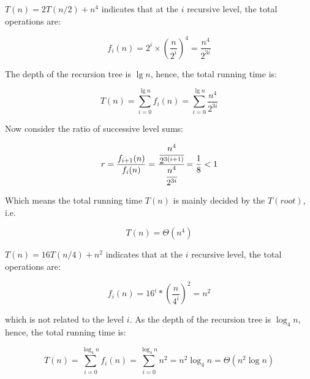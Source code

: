 \begin{homeworkProblem}

\begin{homeworkSubProblem}[\texorpdfstring{$T(n)=2T(n/2)+n^4$}{T(n)=2T(n/2)+n\textasciicircum 4}]\label{sub6.1}
$T(n)=2T(n/2)+n^4$ indicates that at the $i$ recursive level, the total
operations are:

\begin{equation}
f_i(n) = 2^i\times\left(\frac{n}{2^i}\right)^4=\frac{n^4}{2^{3i}}
\end{equation}

The depth of the recursion tree is $\lg n$, hence, the total running time is:

\begin{equation}T(n) =\sum_{i=0}^{\lg n}f_i(n) = \sum_{i=0}^{\lg n}\frac{n^4}{2^{3i}}
\end{equation}

Now consider the ratio of successive level sums:

\begin{equation}
r = \frac{f_{i+1}(n)}{f_i(n)}
  = \cfrac{\cfrac{n^4}{2^{3(i+1)}}}{\cfrac{n^4}{2^{3i}}}
  = \frac{1}{8}
  < 1
\end{equation}

Which means the total running time $T(n)$ is mainly decided by the $T(root)$, i.e.

\begin{equation}
T(n) = \Theta(n^4)
\end{equation}

\end{homeworkSubProblem}

\begin{homeworkSubProblem}[\texorpdfstring{$T(n)=16T(n/4)+n^2$}{T(n)=16T(n/4)+n\textasciicircum 2}]

$T(n)=16T(n/4)+n^2$ indicates that at the $i$ recursive level, the total
operations are:

\begin{equation}
f_i(n) = 16^i*\left(\frac{n}{4^i}\right)^2=n^2
\end{equation}

which is not related to the level $i$. As the depth of the recursion tree is $\log_4 n$, hence, the total running time is:

\begin{equation} \label{eq:6.2.1}
T(n)
=\sum_{i=0}^{\log_4 n}f_i(n)
= \sum_{i=0}^{\log_4 n}n^2
= n^2 \log_4 n
= \Theta(n^2\log n)
\end{equation}


\end{homeworkSubProblem}
\end{homeworkProblem}
